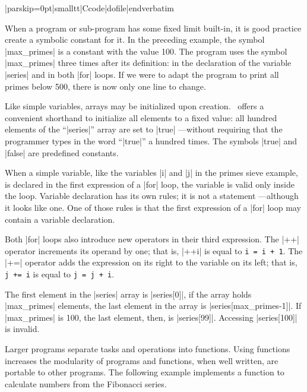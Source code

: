  
\bigskip{}
\verbatim|parskip=0pt|smalltt|Ccode|dofile|endverbatim\endlistingx

\noindent{}%
When a program or sub-program has some fixed limit built-in, it is good
practice create a symbolic constant for it. In the preceding example, the
symbol |max_primes| is a constant with the value 100. The program uses the
symbol |max_primes| three times after its definition: in the declaration of
the variable |series| and in both |for| loops. If we were to adapt the
program to print all primes below 500, there is now only one line to change.

\noindent{}%
Like simple variables, arrays may be initialized upon creation. \Small\ offers
a convenient shorthand to initialize all elements to a fixed value: all
hundred elements of the ``|series|'' array are set to |true| ---without
requiring that the programmer types in the word ``|true|'' a hundred times.
The symbols |true| and |false| are predefined constants.

When a simple variable, like the variables |i| and |j| in the primes sieve
example, is declared in the first expression of a |for| loop, the variable
is valid only inside the loop. Variable declaration has its own rules; it is
not a statement ---although it looks like one.
%
One of those rules is that the first expression of a |for| loop may contain a
variable declaration.

\noindent{}%
Both |for| loops also introduce new operators in their third expression. The
|++| operator increments its operand by one; that is, |++i| is equal to
{\tt i~=~i~+~1}. The |+=| operator adds the expression on its right to the variable
on its left; that is, {\tt j~+=~i} is equal to {\tt j~=~j~+~i}.

The first element in the |series| array is |series[0]|, if the array holds
|max_primes| elements, the last element in the array is |series[max_primes-1]|.
If |max_primes| is 100, the last element, then, is |series[99]|. Accessing
|series[100]| is invalid.

\dingbatseparator

Larger programs separate tasks and operations into functions. Using functions
increases the modularity of programs and functions, when well written, are
portable to other programs. The following example implements a function to
calculate numbers from the Fibonacci series.

